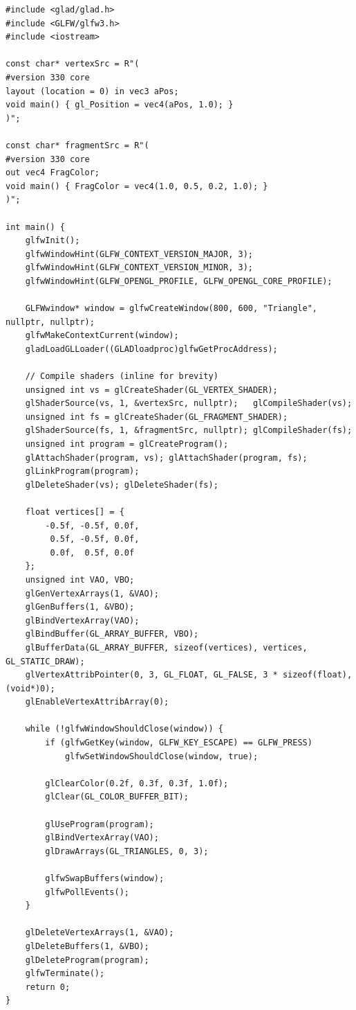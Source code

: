 \documentclass[11pt,a4paper]{article}
\begin{document}
\begin{lstlisting}
#include <glad/glad.h>
#include <GLFW/glfw3.h>
#include <iostream>

const char* vertexSrc = R"(
#version 330 core
layout (location = 0) in vec3 aPos;
void main() { gl_Position = vec4(aPos, 1.0); }
)";

const char* fragmentSrc = R"(
#version 330 core
out vec4 FragColor;
void main() { FragColor = vec4(1.0, 0.5, 0.2, 1.0); }
)";

int main() {
    glfwInit();
    glfwWindowHint(GLFW_CONTEXT_VERSION_MAJOR, 3);
    glfwWindowHint(GLFW_CONTEXT_VERSION_MINOR, 3);
    glfwWindowHint(GLFW_OPENGL_PROFILE, GLFW_OPENGL_CORE_PROFILE);

    GLFWwindow* window = glfwCreateWindow(800, 600, "Triangle", nullptr, nullptr);
    glfwMakeContextCurrent(window);
    gladLoadGLLoader((GLADloadproc)glfwGetProcAddress);

    // Compile shaders (inline for brevity)
    unsigned int vs = glCreateShader(GL_VERTEX_SHADER);
    glShaderSource(vs, 1, &vertexSrc, nullptr);   glCompileShader(vs);
    unsigned int fs = glCreateShader(GL_FRAGMENT_SHADER);
    glShaderSource(fs, 1, &fragmentSrc, nullptr); glCompileShader(fs);
    unsigned int program = glCreateProgram();
    glAttachShader(program, vs); glAttachShader(program, fs);
    glLinkProgram(program);
    glDeleteShader(vs); glDeleteShader(fs);

    float vertices[] = {
        -0.5f, -0.5f, 0.0f,
         0.5f, -0.5f, 0.0f,
         0.0f,  0.5f, 0.0f
    };
    unsigned int VAO, VBO;
    glGenVertexArrays(1, &VAO);
    glGenBuffers(1, &VBO);
    glBindVertexArray(VAO);
    glBindBuffer(GL_ARRAY_BUFFER, VBO);
    glBufferData(GL_ARRAY_BUFFER, sizeof(vertices), vertices, GL_STATIC_DRAW);
    glVertexAttribPointer(0, 3, GL_FLOAT, GL_FALSE, 3 * sizeof(float), (void*)0);
    glEnableVertexAttribArray(0);

    while (!glfwWindowShouldClose(window)) {
        if (glfwGetKey(window, GLFW_KEY_ESCAPE) == GLFW_PRESS)
            glfwSetWindowShouldClose(window, true);

        glClearColor(0.2f, 0.3f, 0.3f, 1.0f);
        glClear(GL_COLOR_BUFFER_BIT);

        glUseProgram(program);
        glBindVertexArray(VAO);
        glDrawArrays(GL_TRIANGLES, 0, 3);

        glfwSwapBuffers(window);
        glfwPollEvents();
    }

    glDeleteVertexArrays(1, &VAO);
    glDeleteBuffers(1, &VBO);
    glDeleteProgram(program);
    glfwTerminate();
    return 0;
}
\end{lstlisting}
\end{document}
